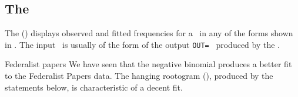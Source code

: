 \subsection{The }\label{discrete-root}
The  () displays observed and fitted frequencies
for a \Dset\ in any of the forms shown in .
The input \Dset\ is usually of the form of the output
\texttt{OUT=} \Dset\ produced by the .

\begin{Example}[federalist2]{Federalist papers}
We have seen that the negative binomial produces a better fit to the
Federalist Papers data.  The hanging rootogram (),
produced by the statements below, is characteristic of a decent fit.
\begin{listing}
\end{listing}
\end{Example}


